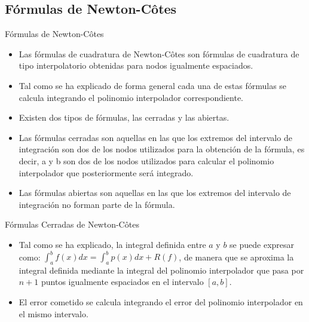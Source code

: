 \documentclass[12pt]{beamer}
\begin{document}
\subsection{F\'ormulas de Newton-C\^otes}
\begin{frame}{F\'ormulas de Newton-C\^otes}
  \begin{itemize}
    \item Las fórmulas de cuadratura de Newton-C\^otes son fórmulas de cuadratura de tipo interpolatorio obtenidas
    para nodos igualmente espaciados.
    \item<2-> Tal como se ha explicado de forma general cada una de estas fórmulas
    se calcula integrando el polinomio interpolador correspondiente.
    \item<3-> Existen dos tipos de fórmulas, las cerradas y las abiertas.
    \item<4-> Las fórmulas cerradas son aquellas en las que los extremos del intervalo de integración son dos de los nodos utilizados para la obtención de la fórmula, es decir, a y b son dos de los nodos utilizados para calcular el
    polinomio interpolador que posteriormente será integrado.
    \item<5-> Las fórmulas abiertas son aquellas en las que los extremos del intervalo de integración no forman parte de la fórmula.
  \end{itemize}
\end{frame}
\begin{frame}{F\'ormulas Cerradas de Newton-C\^otes}
  \begin{itemize}
    \item Tal como se ha explicado, la integral definida entre $a$ y $b$ se puede expresar como: $\int_a^bf(x)dx =\int_{a}^{b}p(x)dx+R(f)$, de manera que se aproxima la integral definida mediante la integral del
    polinomio interpolador que pasa por $n+1$ puntos igualmente espaciados en el intervalo $[a,b]$.
    \item<2->El error cometido se calcula integrando el error del polinomio interpolador en el mismo intervalo.
  \end{itemize}
\end{frame}
\end{document}
